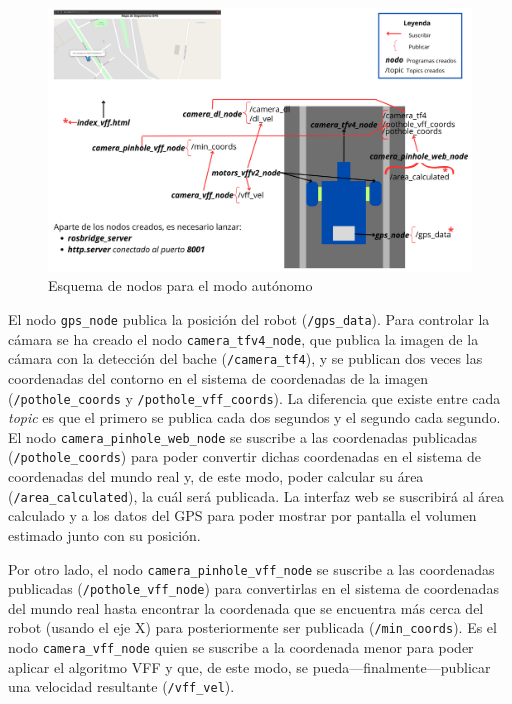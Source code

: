 \begin{figure} [h!]
	\begin{center}
			\includegraphics[width=15cm]{figs/cap7/esquema_nodos_vff_ampliado.png}
		\end{center}
	\caption{Esquema de nodos para el modo autónomo}
	\label{fig:nodosvff}
\end{figure}


El nodo \verb|gps_node| publica la posición del robot (\verb|/gps_data|). Para controlar la cámara se ha creado el nodo \verb|camera_tfv4_node|, que publica la imagen de la cámara con la detección del bache (\verb|/camera_tf4|), y se publican dos veces las coordenadas del contorno en el sistema de coordenadas de la imagen (\verb|/pothole_coords| y \verb|/pothole_vff_coords|). La diferencia que existe entre cada \textit{topic} es que el primero se publica cada dos segundos y el segundo cada segundo. El nodo \verb|camera_pinhole_web_node| se suscribe a las coordenadas publicadas (\verb|/pothole_coords|) para poder convertir dichas coordenadas en el sistema de coordenadas del mundo real y, de este modo, poder calcular su área (\verb|/area_calculated|), la cuál será publicada. La interfaz web se suscribirá al área calculado y a los datos del \acs{GPS} para poder mostrar por pantalla el volumen estimado junto con su posición. 

Por otro lado, el nodo \verb|camera_pinhole_vff_node| se suscribe a las coordenadas publicadas (\verb|/pothole_vff_node|) para convertirlas en el sistema de coordenadas del mundo real hasta encontrar la coordenada que se encuentra más cerca del robot (usando el eje X) para posteriormente ser publicada (\verb|/min_coords|). Es el nodo \verb|camera_vff_node| quien se suscribe a la coordenada menor para poder aplicar el algoritmo \acs{VFF} y que, de este modo, se pueda—finalmente—publicar una velocidad resultante (\verb|/vff_vel|).

